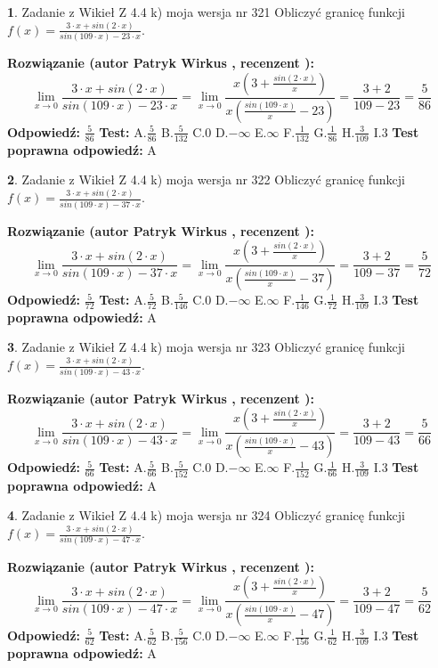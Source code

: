 \documentclass[12pt, a4paper]{article}
\theoremstyle{definition} %
\newtheorem{zad}{}
\newcommand{\zadStart}[1]{\begin{zad}#1\newline}
\newcommand{\zadStop}{\end{zad}}
\newcommand{\rozwStart}[2]{\noindent \textbf{Rozwiązanie (autor #1 , recenzent #2): }\newline}
\newcommand{\rozwStop}{\newline}
\newcommand{\odpStart}{\noindent \textbf{Odpowiedź:}\newline}
\newcommand{\odpStop}{\newline}
\newcommand{\testStart}{\noindent \textbf{Test:}\newline}
\newcommand{\testStop}{\newline}
\newcommand{\kluczStart}{\noindent \textbf{Test poprawna odpowiedź:}\newline}
\newcommand{\kluczStop}{\newline}
\begin{document}
\zadStart{Zadanie z Wikieł Z 4.4 k) moja wersja nr 321}
Obliczyć granicę funkcji $f(x)=\frac{3\cdot x +sin(2\cdot x)}{sin(109\cdot x) -23\cdot x}$.
\zadStop
\rozwStart{Patryk Wirkus}{}
$$\lim\limits_{x\to 0}\frac{3\cdot x +sin(2\cdot x)}{sin(109\cdot x) -23\cdot x}
=\lim\limits_{x\to 0}\frac{x(3+\frac{sin(2\cdot x)}{x})}{x(\frac{sin(109\cdot x)}{x}-23)}
=\frac{3+2}{109-23} = \frac{5}{86}$$
\rozwStop
\odpStart
$\frac{5}{86}$
\odpStop
\testStart
A.$\frac{5}{86}$
B.$\frac{5}{132}$
C.$0$
D.$-\infty$
E.$\infty$
F.$\frac{1}{132}$
G.$\frac{1}{86}$
H.$\frac{3}{109}$
I.$3$
\testStop
\kluczStart
A
\kluczStop



\zadStart{Zadanie z Wikieł Z 4.4 k) moja wersja nr 322}
Obliczyć granicę funkcji $f(x)=\frac{3\cdot x +sin(2\cdot x)}{sin(109\cdot x) -37\cdot x}$.
\zadStop
\rozwStart{Patryk Wirkus}{}
$$\lim\limits_{x\to 0}\frac{3\cdot x +sin(2\cdot x)}{sin(109\cdot x) -37\cdot x}
=\lim\limits_{x\to 0}\frac{x(3+\frac{sin(2\cdot x)}{x})}{x(\frac{sin(109\cdot x)}{x}-37)}
=\frac{3+2}{109-37} = \frac{5}{72}$$
\rozwStop
\odpStart
$\frac{5}{72}$
\odpStop
\testStart
A.$\frac{5}{72}$
B.$\frac{5}{146}$
C.$0$
D.$-\infty$
E.$\infty$
F.$\frac{1}{146}$
G.$\frac{1}{72}$
H.$\frac{3}{109}$
I.$3$
\testStop
\kluczStart
A
\kluczStop



\zadStart{Zadanie z Wikieł Z 4.4 k) moja wersja nr 323}
Obliczyć granicę funkcji $f(x)=\frac{3\cdot x +sin(2\cdot x)}{sin(109\cdot x) -43\cdot x}$.
\zadStop
\rozwStart{Patryk Wirkus}{}
$$\lim\limits_{x\to 0}\frac{3\cdot x +sin(2\cdot x)}{sin(109\cdot x) -43\cdot x}
=\lim\limits_{x\to 0}\frac{x(3+\frac{sin(2\cdot x)}{x})}{x(\frac{sin(109\cdot x)}{x}-43)}
=\frac{3+2}{109-43} = \frac{5}{66}$$
\rozwStop
\odpStart
$\frac{5}{66}$
\odpStop
\testStart
A.$\frac{5}{66}$
B.$\frac{5}{152}$
C.$0$
D.$-\infty$
E.$\infty$
F.$\frac{1}{152}$
G.$\frac{1}{66}$
H.$\frac{3}{109}$
I.$3$
\testStop
\kluczStart
A
\kluczStop



\zadStart{Zadanie z Wikieł Z 4.4 k) moja wersja nr 324}
Obliczyć granicę funkcji $f(x)=\frac{3\cdot x +sin(2\cdot x)}{sin(109\cdot x) -47\cdot x}$.
\zadStop
\rozwStart{Patryk Wirkus}{}
$$\lim\limits_{x\to 0}\frac{3\cdot x +sin(2\cdot x)}{sin(109\cdot x) -47\cdot x}
=\lim\limits_{x\to 0}\frac{x(3+\frac{sin(2\cdot x)}{x})}{x(\frac{sin(109\cdot x)}{x}-47)}
=\frac{3+2}{109-47} = \frac{5}{62}$$
\rozwStop
\odpStart
$\frac{5}{62}$
\odpStop
\testStart
A.$\frac{5}{62}$
B.$\frac{5}{156}$
C.$0$
D.$-\infty$
E.$\infty$
F.$\frac{1}{156}$
G.$\frac{1}{62}$
H.$\frac{3}{109}$
I.$3$
\testStop
\kluczStart
A
\kluczStop
\end{document}
